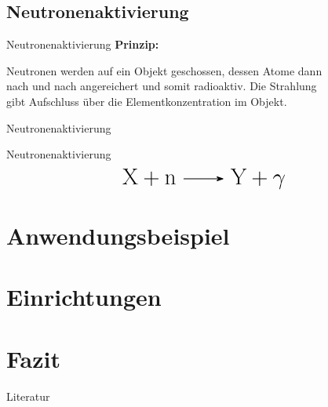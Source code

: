 \documentclass[xcolor=dvipsnames, aspectratio=169]{beamer}
\begin{document}
\subsection{Neutronenaktivierung}

\begin{frame}{Neutronenaktivierung}
\textbf{Prinzip:}
\begin{center}
Neutronen werden auf ein Objekt geschossen, dessen Atome dann\\ nach und nach angereichert und somit radioaktiv. Die Strahlung\\ gibt Aufschluss über die Elementkonzentration im Objekt.
\end{center}
\end{frame}

\begin{frame}{Neutronenaktivierung}
\begin{center}\vspace*{-2.5em}
\end{center}
\end{frame}

\begin{frame}{Neutronenaktivierung}
\[\huge\text{\ce{X + n -> Y + \gamma}}\]
\end{frame}

\section{Anwendungsbeispiel}

\section{Einrichtungen}

\section{Fazit}
\begin{frame}[allowframebreaks]{Literatur}
\nocite{*}

\printbibliography[heading=none]
\end{frame}

\maketitle
\end{document}
